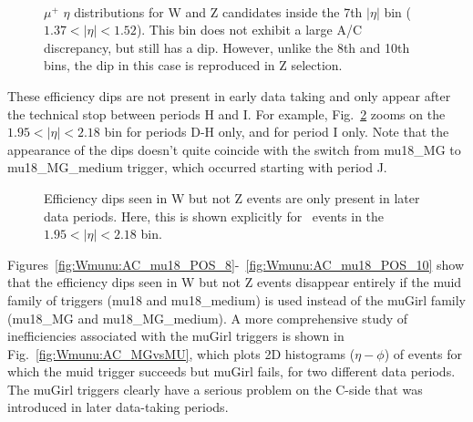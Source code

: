 \begin{figure}[phtb]
  \begin{center}
         \\
 \caption{ $\mu^+$ $\eta$ distributions for W and Z candidates inside the 7th $|\eta|$ bin ($1.37<|\eta|<1.52$). This bin does not exhibit a large A/C discrepancy, but still has a dip. However, unlike the 8th and 10th bins, the dip in this case is reproduced in Z selection. }
 \label{fig:Wmunu:AC_eta_POS_7}
 \end{center}
\end{figure}

These efficiency dips are not present in early data taking and only appear after the technical stop between periods H and I. For example, Fig.~\ref{fig:Wmunu:AC_period} zooms on the $1.95<|\eta|<2.18$ bin for periods D-H only, and for period I only. Note that the appearance of the dips doesn't quite coincide with the switch from mu18\_MG to mu18\_MG\_medium trigger, which occurred starting with period J.

\begin{figure}[phtb]
  \begin{center}
 \caption{ Efficiency dips seen in W but not Z events are only present in later data periods. Here, this is shown explicitly for \Wminus\ events in the $1.95<|\eta|<2.18$ bin.}
 \label{fig:Wmunu:AC_period}
 \end{center}
\end{figure}

Figures~\ref{fig:Wmunu:AC_mu18_POS_8}-~\ref{fig:Wmunu:AC_mu18_POS_10} show that the efficiency dips seen in W but not Z events disappear entirely if the muid family of triggers (mu18 and mu18\_medium) is used instead of the muGirl family (mu18\_MG and mu18\_MG\_medium). A more comprehensive study of inefficiencies associated with the muGirl triggers is shown in Fig.~\ref{fig:Wmunu:AC_MGvsMU}, which plots 2D histograms ($\eta-\phi$) of events for which the muid trigger succeeds but muGirl fails, for two different data periods. The muGirl triggers clearly have a serious problem on the C-side that was introduced in later data-taking periods.

